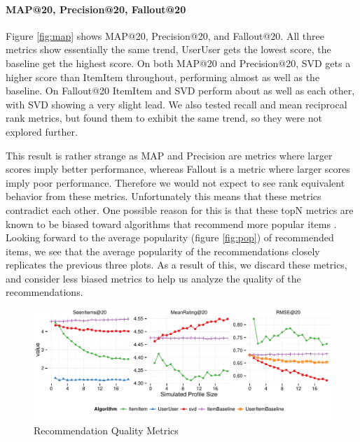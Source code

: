 \documentclass[letterpaper]{sig-alternate}
\begin{document}
\paragraph{MAP@20, Precision@20, Fallout@20}
  Figure \ref{fig:map} shows MAP@20, Precision@20, and Fallout@20.
  All three metrics show essentially the same trend, UserUser gets the lowest score, the baseline get the highest score.
  On both MAP@20 and Precision@20, SVD gets a higher score than ItemItem throughout, performing almost as well as the baseline.
  On Fallout@20 ItemItem and SVD perform about as well as each other, with SVD showing a very slight lead.
  We also tested recall and mean reciprocal rank metrics, but found them to exhibit the same trend, so they were not explored further.

  This result is rather strange as MAP and Precision are metrics where larger scores imply better performance, whereas Fallout is a metric where larger scores imply poor performance.
  Therefore we would not expect to see rank equivalent behavior from these metrics.
  Unfortunately this means that these metrics contradict each other.
  One possible reason for this is that these topN metrics are known to be biased toward algorithms that recommend more popular items \cite{bellogin}.
  Looking forward to the average popularity (figure \ref{fig:pop}) of recommended items, we see that the average popularity of the recommendations closely replicates the previous three plots.
  As a result of this, we discard these metrics, and consider less biased metrics to help us analyze the quality of the recommendations.


\begin{figure}[ht!]
  \centering
  \includegraphics[width=\linewidth]{../lenskit/output/ekstrandTuned20/rmse_20.pdf}
  \caption{Recommendation Quality Metrics}
  \label{fig:topN.rmse}
\end{figure}
\end{document}
